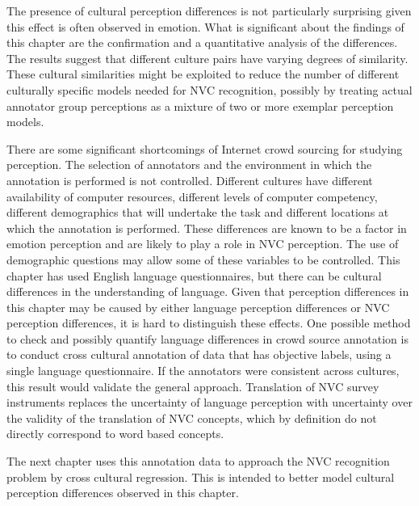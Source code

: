 The presence of cultural perception differences is not particularly surprising given this effect is often observed in emotion. What is significant about the findings of this chapter are the confirmation and a quantitative analysis of the differences. The results suggest that different culture pairs have varying degrees of similarity. These cultural similarities might be exploited to reduce the number of different culturally specific models needed for \ac{NVC} recognition, possibly by treating actual annotator group perceptions as a mixture of two or more exemplar perception models.

There are some significant shortcomings of Internet crowd sourcing for studying perception. The selection of annotators and the environment in which the annotation is performed is not controlled. Different cultures have different availability of computer resources, different levels of computer competency, different demographics that will undertake the task and different locations at which the annotation is performed. These differences are known to be a factor in emotion perception and are likely to play a role in \ac{NVC} perception. The use of demographic questions may allow some of these variables to be controlled. This chapter has used English language questionnaires, but there can be cultural differences in the understanding of language. Given that perception differences in this chapter may be caused by either language perception differences or \ac{NVC} perception differences, it is hard to distinguish these effects. One possible method to check and possibly quantify language differences in crowd source annotation is to conduct cross cultural annotation of data that has objective labels, using a single language questionnaire. If the annotators were consistent across cultures, this result would validate the general approach. Translation of \ac{NVC} survey instruments replaces the uncertainty of language perception with uncertainty over the validity of the translation of \ac{NVC} concepts, which by definition do not directly correspond to word based concepts.


The next chapter uses this annotation data to approach the \ac{NVC} recognition problem by cross cultural regression. This is intended to better model cultural perception differences observed in this chapter.
